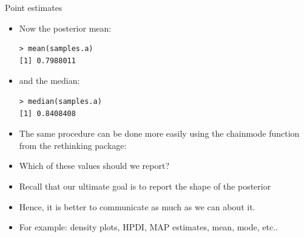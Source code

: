 \documentclass[handout]{beamer}
\begin{document}
\begin{frame}[fragile]{Point estimates}
\scriptsize{
\begin{itemize}

\item Now the posterior mean:

\begin{verbatim}
> mean(samples.a)
[1] 0.7988011
\end{verbatim}


\item and the median:

\begin{verbatim}
> median(samples.a)
[1] 0.8408408
\end{verbatim}

\item The same procedure can be done more easily using the chainmode function from the rethinking package:


\item Which of these values should we report?

\item Recall that our ultimate goal is to report the shape of the posterior

\item Hence, it is better to communicate as much as we can about it.  

\item For example: density plots, HPDI, MAP estimates, mean, mode, etc..


\end{itemize}



} 

\end{frame}
\end{document}
